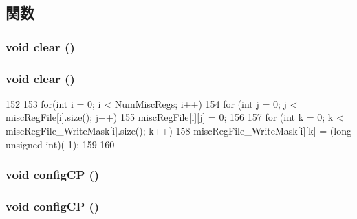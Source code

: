 \subsection{関数}
\hypertarget{classMipsISA_1_1ISA_ac8bb3912a3ce86b15842e79d0b421204}{
\subsubsection[{clear}]{\setlength{\rightskip}{0pt plus 5cm}void clear ()}}
\label{classMipsISA_1_1ISA_ac8bb3912a3ce86b15842e79d0b421204}
\hypertarget{classMipsISA_1_1ISA_ac8bb3912a3ce86b15842e79d0b421204}{
\subsubsection[{clear}]{\setlength{\rightskip}{0pt plus 5cm}void clear ()}}
\label{classMipsISA_1_1ISA_ac8bb3912a3ce86b15842e79d0b421204}



\begin{DoxyCode}
152 {
153     for(int i = 0; i < NumMiscRegs; i++) {
154         for (int j = 0; j < miscRegFile[i].size(); j++)
155             miscRegFile[i][j] = 0;
156 
157         for (int k = 0; k < miscRegFile_WriteMask[i].size(); k++)
158             miscRegFile_WriteMask[i][k] = (long unsigned int)(-1);
159     }
160 }
\end{DoxyCode}
\hypertarget{classMipsISA_1_1ISA_af9cb72b444a0f6c58cb2ca90573144eb}{
\subsubsection[{configCP}]{\setlength{\rightskip}{0pt plus 5cm}void configCP ()}}
\label{classMipsISA_1_1ISA_af9cb72b444a0f6c58cb2ca90573144eb}
\hypertarget{classMipsISA_1_1ISA_af9cb72b444a0f6c58cb2ca90573144eb}{
\subsubsection[{configCP}]{\setlength{\rightskip}{0pt plus 5cm}void configCP ()}}
\label{classMipsISA_1_1ISA_af9cb72b444a0f6c58cb2ca90573144eb}



